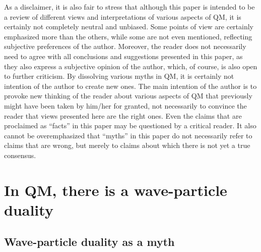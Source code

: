 \documentclass[12pt]{article}
\begin{document}
As a disclaimer, it is also fair to stress that
although this paper is intended to be a review of 
different views and interpretations of various aspects of QM,
it is certainly not completely neutral and unbiased. Some 
points of view are certainly emphasized more than the others,
while some are not even mentioned, 
reflecting subjective preferences of the author.
Moreover, the reader does not necessarily need to agree with
all conclusions and suggestions presented in this paper, as they also 
express a subjective opinion of the author,
which, of course, is also open to further criticism.
By dissolving various myths in QM, it is certainly not intention
of the author to create new ones. 
The main intention of the author
is to provoke new thinking of the reader
about various aspects of QM that previously might have been taken 
by him/her for granted, not necessarily to convince the reader
that views presented here are the right ones.   
Even the claims that are proclaimed as ``facts'' in this paper
may be questioned by a critical reader.
It also cannot be overemphasized that ``myths'' in this paper
do not necessarily refer to claims that are wrong, but merely
to claims about which there is not yet a true consensus.


\section{In QM, there is a wave-particle duality}

\subsection{Wave-particle duality as a myth}
\end{document}
